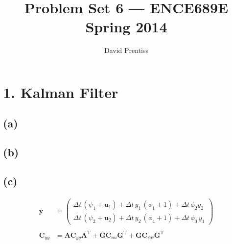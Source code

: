 \documentclass[fleqn, letterpaper]{tufte-handout}
\title{Problem Set 6 --- ENCE689E Spring 2014}
\author{David Prentiss}
\newcommand{\T}{^\text{T}}
\newcommand{\y}{\mathbf{y}}
\newcommand{\A}{\mathbf{A}}
\newcommand{\GG}{\mathbf{G}}
\newcommand{\uu}{\mathbf{u}}
\newcommand{\cyy}{\mathbf{C}_{yy}}
\newcommand{\cuu}{\mathbf{C}_{uu}}
\newcommand{\cpp}{\mathbf{C}_{\psi\psi}}
\begin{document}
\maketitle

\section{1. Kalman Filter}
\subsection{(a)}
\subsection{(b)}
\subsection{(c)}
\begin{align*}
\y &= \left(\begin{array}{c} \Delta t\, \left(\psi_1+ \uu_1\right) + \Delta t\, y_1\, \left(\phi_1 + 1\right) + \Delta t\, \phi_2 y_2\\ \Delta t\, \left(\psi_2 + \uu_2\right) + \Delta t\, y_2\, \left(\phi_4 + 1\right) + \Delta t\, \phi_3\, y_1 \end{array}\right) \\ \\
\cyy &= \A\cyy\A\T + \GG\cuu\GG\T + \GG\cpp\GG\T
\end{align*}
\end{document}
